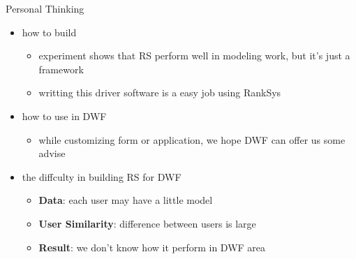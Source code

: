 \documentclass{beamer}
\begin{document}
\begin{frame}{Personal Thinking}
    \begin{itemize}
        \item how to build
        \begin{itemize}
            \item experiment shows that RS perform well in modeling work, but it's just a framework
            \item writting this driver software is a easy job using RankSys
        \end{itemize}
        \item how to use in DWF
        \begin{itemize}
            \item while customizing form or application, 
            we hope DWF can offer us some advise
        \end{itemize}
        \item the diffculty in building RS for DWF
        \begin{itemize}
            \item \textbf{Data}: each user may have a little model
            \item \textbf{User Similarity}: difference between users is large
            \item \textbf{Result}: we don't know how it perform in DWF area
        \end{itemize}
    \end{itemize}
\end{frame}

\end{document}
